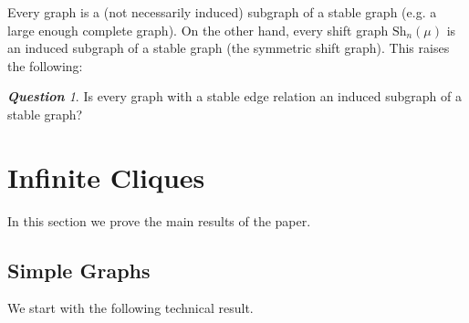 \documentclass[a4paper]{amsart}
\theoremstyle{plain}
\newtheorem{lemma}[theorem]{Lemma}
\theoremstyle{definition}
\theoremstyle{remark}
\newtheorem{question}[theorem]{\textbf{Question}}
\numberwithin{equation}{section}
\newcommand{\Sh}{\text{Sh}}
\begin{document}
Every graph is a (not necessarily induced) subgraph of a stable graph (e.g. a large enough complete graph). On the other hand, every shift graph $\Sh_n(\mu)$ is an induced subgraph of a stable graph (the symmetric shift graph). This raises the following:

\begin{question}
Is every graph with a stable edge relation an induced subgraph of a stable graph?
\end{question}

\section{Infinite Cliques}\label{sec:infinite cliques}
In this section we prove the main results of the paper. 

%

\subsection{Simple Graphs}
We start with the following technical result.
\end{document}
